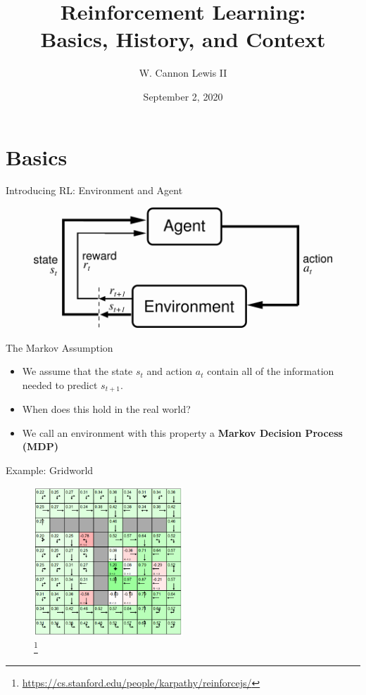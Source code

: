 \documentclass{beamer}
\title{Reinforcement Learning:\\ Basics, History, and Context}
\author{W. Cannon Lewis II}
\date{September 2, 2020}
\begin{document}
\begin{frame}
  \titlepage
\end{frame}

\section{Basics}
\begin{frame}{Introducing RL: Environment and Agent}
  \begin{figure}
    \includegraphics[keepaspectratio,width=\textwidth]{assets/agent_env}
  \end{figure}
\end{frame}

\begin{frame}{The Markov Assumption}
  \begin{itemize}
    \item We assume that the state $s_t$ and action $a_t$ contain all of the information needed to predict $s_{t+1}$. \\
    \item When does this hold in the real world? \\
    \item We call an environment with this property a \textbf{Markov Decision Process (MDP)}
  \end{itemize}
\end{frame}

\begin{frame}{Example: Gridworld}
  \begin{figure}
    \includegraphics[keepaspectratio,width=0.5\textwidth]{assets/gridworld}
    \caption{\footnote{\url{https://cs.stanford.edu/people/karpathy/reinforcejs/}}}
  \end{figure}
\end{frame}
\end{document}
